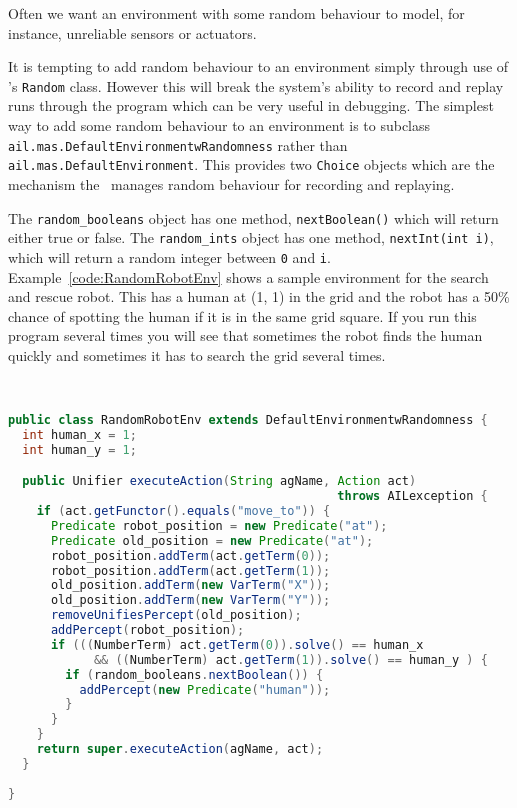 Often we want an environment with some random behaviour to model, for instance, unreliable sensors or actuators.

\begin{sloppypar}
It is tempting to add random behaviour to an environment simply through use of \java's \texttt{Random} class.  However this will break the system's ability to record and replay runs through the program which can be very useful in debugging.  The simplest way to add some random behaviour to an environment is to subclass \texttt{ail.mas.DefaultEnvironmentwRandomness} rather than \texttt{ail.mas.DefaultEnvironment}.  This provides two \texttt{Choice} objects which are the mechanism the \ail\ manages random behaviour for recording and replaying.
\end{sloppypar}

The \texttt{random\_booleans} object has one method, \texttt{nextBoolean()} which will return either true or false.  The \texttt{random\_ints} object has one method, \texttt{nextInt(int i)}, which will return a random integer between \texttt{0} and \texttt{i}.  Example~\ref{code:RandomRobotEnv} shows a sample environment for the search and rescue robot.  This has a human at (1, 1) in the grid and the robot has a 50\% chance of spotting the human if it is in the same grid square.   If you run this program several times you will see that sometimes the robot finds the human quickly and sometimes it has to search the grid several times.

\begin{ourexample}
\label{code:RandomRobotEnv} \quad \\
\begin{lstlisting}[basicstyle=\sffamily,language=Java,style=easslisting]
public class RandomRobotEnv extends DefaultEnvironmentwRandomness {
  int human_x = 1;
  int human_y = 1;

  public Unifier executeAction(String agName, Action act) 
                                              throws AILexception {
    if (act.getFunctor().equals("move_to")) {
      Predicate robot_position = new Predicate("at");
      Predicate old_position = new Predicate("at");
      robot_position.addTerm(act.getTerm(0));
      robot_position.addTerm(act.getTerm(1));
      old_position.addTerm(new VarTerm("X"));
      old_position.addTerm(new VarTerm("Y"));
      removeUnifiesPercept(old_position);
      addPercept(robot_position);
      if (((NumberTerm) act.getTerm(0)).solve() == human_x 
            && ((NumberTerm) act.getTerm(1)).solve() == human_y ) {
        if (random_booleans.nextBoolean()) {
          addPercept(new Predicate("human"));
        }
      }
    }
    return super.executeAction(agName, act);
  }
	      
}
\end{lstlisting}
\end{ourexample}

